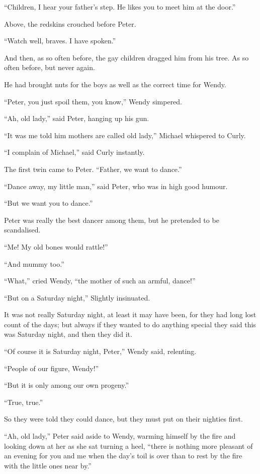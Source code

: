 ``Children, I hear your father's step. He likes you to meet him at the
door.''

Above, the redskins crouched before Peter.

``Watch well, braves. I have spoken.''

And then, as so often before, the gay children dragged him from his
tree. As so often before, but never again.

He had brought nuts for the boys as well as the correct time for Wendy.

``Peter, you just spoil them, you know,'' Wendy simpered.

``Ah, old lady,'' said Peter, hanging up his gun.

``It was me told him mothers are called old lady,'' Michael whispered to
Curly.

``I complain of Michael,'' said Curly instantly.

The first twin came to Peter. ``Father, we want to dance.''

``Dance away, my little man,'' said Peter, who was in high good humour.

``But we want you to dance.''

Peter was really the best dancer among them, but he pretended to be
scandalised.

``Me! My old bones would rattle!''

``And mummy too.''

``What,'' cried Wendy, ``the mother of such an armful, dance!''

``But on a Saturday night,'' Slightly insinuated.

It was not really Saturday night, at least it may have been, for they
had long lost count of the days; but always if they wanted to do
anything special they said this was Saturday night, and then they did
it.

``Of course it is Saturday night, Peter,'' Wendy said, relenting.

``People of our figure, Wendy!''

``But it is only among our own progeny.''

``True, true.''

So they were told they could dance, but they must put on their nighties
first.

``Ah, old lady,'' Peter said aside to Wendy, warming himself by the fire
and looking down at her as she sat turning a heel, ``there is nothing
more pleasant of an evening for you and me when the day's toil is over
than to rest by the fire with the little ones near by.''

